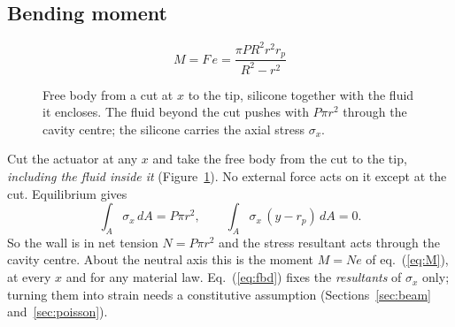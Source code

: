\documentclass[11pt,a4paper]{article}
\numberwithin{equation}{section}
\newcommand{\rp}{r_p}
\begin{document}
\subsection{Bending moment}
\begin{equation}
\boxed{\;M = F\,e = \frac{\pi P R^2 r^2 \rp}{R^2-r^2}\;} \label{eq:M}
\end{equation}

\begin{figure}[H]
\centering
{}
\caption{Free body from a cut at $x$ to the tip, silicone together with the fluid it encloses. The fluid beyond the cut
pushes with $P\pi r^2$ through the cavity centre; the silicone carries the axial stress $\sigma_x$.}
\label{fig:fbd}
\end{figure}

\begin{remark}
Cut the actuator at any $x$ and take the free body from the cut to the tip, \emph{including the fluid inside it}
(Figure~\ref{fig:fbd}). No external force acts on it except at the cut. Equilibrium gives
\begin{equation}
\int_A \sigma_x\,dA = P\pi r^2 ,\qquad \int_A \sigma_x\,(y-\rp)\,dA = 0 . \label{eq:fbd}
\end{equation}
So the wall is in net tension $N=P\pi r^2$ and the stress resultant acts through the cavity centre. About the neutral axis this
is the moment $M = N e$ of eq.~(\ref{eq:M}), at every $x$ and for any material law.
Eq.~(\ref{eq:fbd}) fixes the \emph{resultants} of $\sigma_x$ only; turning them into strain needs a constitutive assumption (Sections~\ref{sec:beam} and~\ref{sec:poisson}).
\end{remark}
\end{document}
